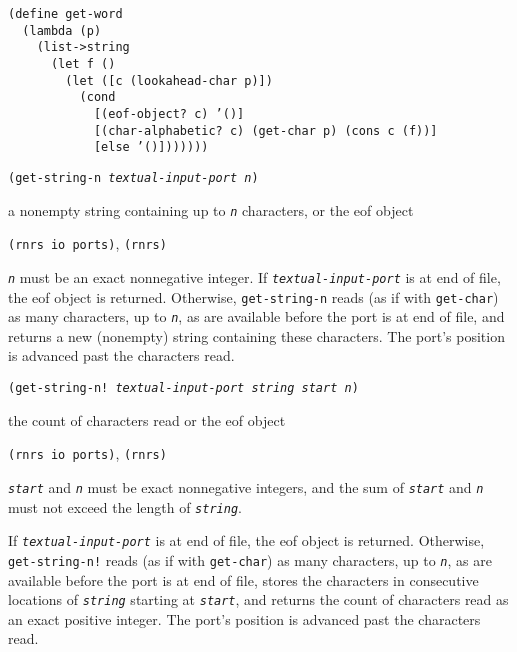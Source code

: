 \begin{alltt}
(define get-word
  (lambda (p)
    (list-\textgreater{}string
      (let f ()
        (let ([c (lookahead-char p)])
          (cond
            [(eof-object? c) '()]
            [(char-alphabetic? c) (get-char p) (cons c (f))]
            [else '()]))))))
\end{alltt}

\begin{description}

\label{io_s63}\item[procedure] \texttt{(get-string-n \textit{textual-input-port} \textit{n})}



\item[returns] a nonempty string containing up to \texttt{\textit{n}} characters, or the eof object


\item[libraries] \texttt{(rnrs io ports)}, \texttt{(rnrs)}
\end{description}

\texttt{\textit{n}} must be an exact nonnegative integer.
If \texttt{\textit{textual-input-port}} is at end of file, the eof object is returned.
Otherwise, \texttt{get-string-n} reads (as if with \texttt{get-char})
as many characters, up to \texttt{\textit{n}}, as are available before the port is at end
of file, and returns a new (nonempty) string containing these characters.
The port's position is advanced past the characters read.

\begin{description}

\label{io_s64}\item[procedure] \texttt{(get-string-n! \textit{textual-input-port} \textit{string} \textit{start} \textit{n})}



\item[returns] the count of characters read or the eof object


\item[libraries] \texttt{(rnrs io ports)}, \texttt{(rnrs)}
\end{description}

\texttt{\textit{start}} and \texttt{\textit{n}} must be exact nonnegative integers, and the sum of
\texttt{\textit{start}} and \texttt{\textit{n}} must not exceed the length of \texttt{\textit{string}}.

If \texttt{\textit{textual-input-port}} is at end of file, the eof object is returned.
Otherwise, \texttt{get-string-n!} reads (as if with \texttt{get-char})
as many characters, up to \texttt{\textit{n}}, as are available before the port is at end
of file, stores the characters in consecutive locations of \texttt{\textit{string}}
starting at \texttt{\textit{start}}, and returns the count of characters read as an exact
positive integer.
The port's position is advanced past the characters read.

